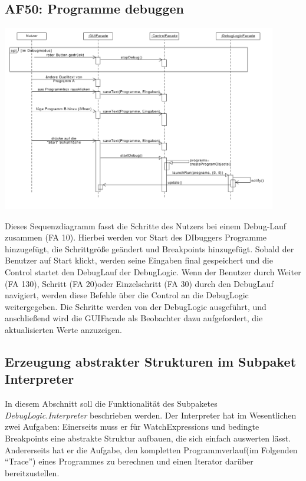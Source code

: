 \documentclass[parskip=full]{scrartcl}
\begin{document}
\subsection{AF50: Programme debuggen}
\begin{center}
\includegraphics[width=0.9\textwidth]{diagrammIdeenUmlet/SequenceDiagrams/seq_AF50PDF.pdf}
\end{center}
Dieses Sequenzdiagramm fasst die Schritte des Nutzers bei einem Debug-Lauf zusammen (FA 10).
Hierbei werden vor Start des DIbuggers Programme hinzugefügt, die Schrittgröße geändert und Breakpoints hinzugefügt.
Sobald der Benutzer auf Start klickt, werden seine Eingaben final gespeichert und die Control startet 
den DebugLauf der DebugLogic.
Wenn der Benutzer durch Weiter (FA 130), Schritt (FA 20)oder Einzelschritt (FA 30) durch den DebugLauf navigiert, werden diese Befehle über
die Control an die DebugLogic weitergegeben. Die Schritte werden von der DebugLogic ausgeführt, und anschließend
wird die GUIFacade als Beobachter dazu aufgefordert, die aktualisierten Werte anzuzeigen.
\subsection{Erzeugung abstrakter Strukturen im Subpaket Interpreter}
In diesem Abschnitt soll die Funktionalität des Subpaketes \textit{DebugLogic.Interpreter} beschrieben werden. Der Interpreter hat im Wesentlichen zwei Aufgaben: Einerseits muss er für WatchExpressions und bedingte Breakpoints eine abstrakte Struktur aufbauen, die sich einfach auswerten lässt. Andererseits hat er die Aufgabe, den kompletten Programmverlauf(im Folgenden \enquote{Trace})  eines Programmes zu berechnen und einen Iterator darüber bereitzustellen.
\end{document}

